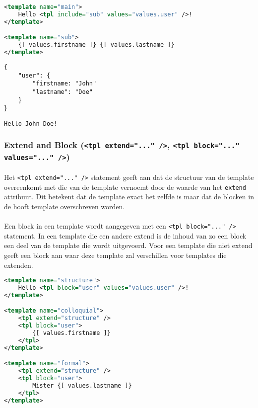 \begin{lstlisting}[language=xml]
<template name="main">
	Hello <tpl include="sub" values="values.user" />!
</template>

<template name="sub">
	{[ values.firstname ]} {[ values.lastname ]}
</template>
\end{lstlisting}

\begin{lstlisting}
{
	"user": {
		"firstname: "John"
		"lastname": "Doe"
	}
}
\end{lstlisting}

\begin{lstlisting}
Hello John Doe!
\end{lstlisting}


\subsubsection {Extend and Block (\lstinline{<tpl extend="..." />}, \lstinline{<tpl block="..." values="..." />})}

\paragraph {} Het \lstinline{<tpl extend="..." />} statement geeft aan dat de structuur
van de template overeenkomt met die van de template vernoemt door de waarde van het
\lstinline{extend} attribuut. Dit betekent dat de template exact het zelfde is maar dat de
blocken in de hooft template overschreven worden.

\paragraph {} Een block in een template wordt aangegeven met een
\lstinline{<tpl block="..." />} statement. In een template die een andere extend is de
inhoud van zo een block een deel van de template die wordt uitgevoerd. Voor een template
die niet extend geeft een block aan waar deze template zal verschillen voor templates die
extenden.

\begin{lstlisting}[language=xml]
<template name="structure">
	Hello <tpl block="user" values="values.user" />!
</template>

<template name="colloquial">
	<tpl extend="structure" />
	<tpl block="user">
		{[ values.firstname ]}
	</tpl>
</template>

<template name="formal">
	<tpl extend="structure" />
	<tpl block="user">
		Mister {[ values.lastname ]}
	</tpl>
</template>
\end{lstlisting}

